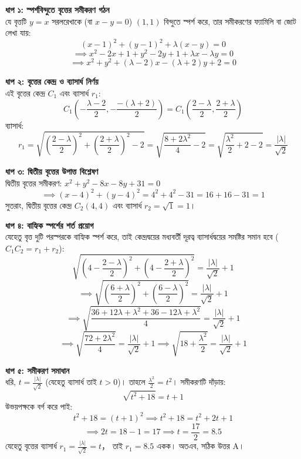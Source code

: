 \documentclass[12pt, a4paper]{article}
\begin{document}
\begin{tcolorbox}[solutionbox={সমাধান (Solution)}]
    \noindent
    \textbf{ধাপ ১: স্পর্শবিন্দুতে বৃত্তের সমীকরণ গঠন} \\
    যে বৃত্তটি $y = x$ সরলরেখাকে (বা $x - y = 0$) $(1, 1)$ বিন্দুতে স্পর্শ করে, তার সমীকরণের ফ্যামিলি বা জোট লেখা যায়:
    \[ (x - 1)^2 + (y - 1)^2 + \lambda(x - y) = 0 \]
    \[ \implies x^2 - 2x + 1 + y^2 - 2y + 1 + \lambda x - \lambda y = 0 \]
    \[ \implies x^2 + y^2 + (\lambda - 2)x - (\lambda + 2)y + 2 = 0 \]
    
    \vspace{0.5em}
    \noindent\textbf{ধাপ ২: বৃত্তের কেন্দ্র ও ব্যাসার্ধ নির্ণয়} \\
    এই বৃত্তের কেন্দ্র $C_1$ এবং ব্যাসার্ধ $r_1$:
    \[ C_1\left(-\frac{\lambda - 2}{2}, -\frac{-(\lambda + 2)}{2}\right) = C_1\left(\frac{2 - \lambda}{2}, \frac{2 + \lambda}{2}\right) \]
    ব্যাসার্ধ:
    \[ r_1 = \sqrt{\left(\frac{2 - \lambda}{2}\right)^2 + \left(\frac{2 + \lambda}{2}\right)^2 - 2} = \sqrt{\frac{8 + 2\lambda^2}{4} - 2} = \sqrt{\frac{\lambda^2}{2} + 2 - 2} = \frac{|\lambda|}{\sqrt{2}} \]
    
    \vspace{0.5em}
    \noindent\textbf{ধাপ ৩: দ্বিতীয় বৃত্তের উপাত্ত বিশ্লেষণ} \\
    দ্বিতীয় বৃত্তের সমীকরণ: $x^2 + y^2 - 8x - 8y + 31 = 0$
    \[ \implies (x - 4)^2 + (y - 4)^2 = 4^2 + 4^2 - 31 = 16 + 16 - 31 = 1 \]
    সুতরাং, দ্বিতীয় বৃত্তের কেন্দ্র $C_2(4, 4)$ এবং ব্যাসার্ধ $r_2 = \sqrt{1} = 1$।
    
    \vspace{0.5em}
    \noindent\textbf{ধাপ ৪: বাহ্যিক স্পর্শের শর্ত প্রয়োগ} \\
    যেহেতু বৃত্ত দুটি পরস্পরকে বাহ্যিক স্পর্শ করে, তাই কেন্দ্রদ্বয়ের মধ্যবর্তী দূরত্ব ব্যাসার্ধদ্বয়ের সমষ্টির সমান হবে ($C_1C_2 = r_1 + r_2$):
    \[ \sqrt{\left(4 - \frac{2 - \lambda}{2}\right)^2 + \left(4 - \frac{2 + \lambda}{2}\right)^2} = \frac{|\lambda|}{\sqrt{2}} + 1 \]
    \[ \implies \sqrt{\left(\frac{6 + \lambda}{2}\right)^2 + \left(\frac{6 - \lambda}{2}\right)^2} = \frac{|\lambda|}{\sqrt{2}} + 1 \]
    \[ \implies \sqrt{\frac{36 + 12\lambda + \lambda^2 + 36 - 12\lambda + \lambda^2}{4}} = \frac{|\lambda|}{\sqrt{2}} + 1 \]
    \[ \implies \sqrt{\frac{72 + 2\lambda^2}{4}} = \frac{|\lambda|}{\sqrt{2}} + 1 \implies \sqrt{18 + \frac{\lambda^2}{2}} = \frac{|\lambda|}{\sqrt{2}} + 1 \]
    
    \vspace{0.5em}
    \noindent\textbf{ধাপ ৫: সমীকরণ সমাধান} \\
    ধরি, $t = \frac{|\lambda|}{\sqrt{2}}$ (যেহেতু ব্যাসার্ধ তাই $t > 0$)। তাহলে $\frac{\lambda^2}{2} = t^2$। 
    সমীকরণটি দাঁড়ায়:
    \[ \sqrt{t^2 + 18} = t + 1 \]
    উভয়পক্ষকে বর্গ করে পাই:
    \[ t^2 + 18 = (t + 1)^2 \implies t^2 + 18 = t^2 + 2t + 1 \]
    \[ \implies 2t = 18 - 1 = 17 \implies t = \frac{17}{2} = 8.5 \]
    যেহেতু বৃত্তের ব্যাসার্ধ $r_1 = \frac{|\lambda|}{\sqrt{2}} = t$， তাই $r_1 = 8.5$ একক।
    অতএব, সঠিক উত্তর A।
\end{tcolorbox}
\end{document}
